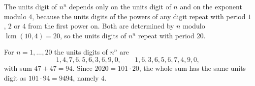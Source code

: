 The units digit of $n^n$ depends only on the units digit of $n$ and on the exponent modulo $4$, because the units digits of the powers of any digit repeat with period $1$, $2$ or $4$ from the first power on. Both are determined by $n$ modulo $\operatorname{lcm}(10,4)=20$, so the units digits of $n^n$ repeat with period $20$.

For $n=1,\dots,20$ the units digits of $n^n$ are
\[1,4,7,6,5,6,3,6,9,0,\qquad 1,6,3,6,5,6,7,4,9,0,\]
with sum $47+47=94$. Since $2020=101\cdot20$, the whole sum has the same units digit as $101\cdot94=9494$, namely $\boxed{4}$.
